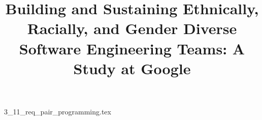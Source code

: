 \documentclass{article}      %
\title{Building and Sustaining Ethnically, Racially, and Gender Diverse Software Engineering Teams: A Study at Google}  %
\begin{document}

\maketitle                   %



{3_11_req_pair_programming.tex}
\printbibliography
\end{document}
